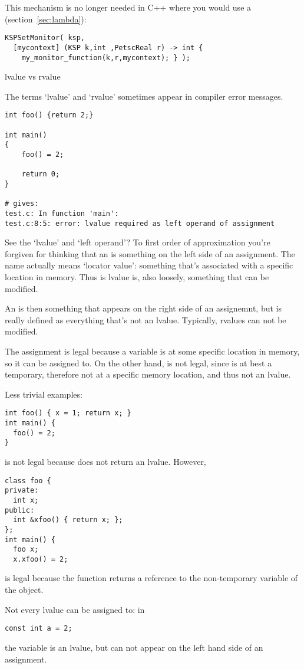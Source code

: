 This mechanism is no longer needed in C++ where you would use a
 (section~\ref{sec:lambda}):
\begin{verbatim}
KSPSetMonitor( ksp,
  [mycontext] (KSP k,int ,PetscReal r) -> int {
    my_monitor_function(k,r,mycontext); } );
\end{verbatim}


 {lvalue vs rvalue}
\label{sec:lrvalue}

The terms `lvalue' and `rvalue' sometimes appear in compiler error
messages.
\begin{verbatim}
int foo() {return 2;}

int main()
{
    foo() = 2;

    return 0;
}

# gives:
test.c: In function 'main':
test.c:8:5: error: lvalue required as left operand of assignment
\end{verbatim}

See the `lvalue' and `left operand'? To first order of approximation
you're forgiven for thinking that an  is something
on the left side of an assignment. The name actually means `locator
value': something that's associated with a specific location in
memory. Thus is lvalue is, also loosely, something that can be modified.

An  is then something that appears on the right
side of an assignemnt, but is really defined as everything that's not
an lvalue. Typically, rvalues can not be modified.

The assignment  is legal because a variable  is at some specific
location in memory, so it can be assigned to. On the other hand,
 is not legal, since  is at best a temporary,
therefore not at a specific memory location, and thus not an lvalue.

Less trivial examples:
\begin{verbatim}
int foo() { x = 1; return x; }
int main() {
  foo() = 2;
}
\end{verbatim}
is not legal because  does not return an lvalue. However,
\begin{verbatim}
class foo {
private:
  int x;
public:
  int &xfoo() { return x; };
};
int main() {
  foo x;
  x.xfoo() = 2;
\end{verbatim}
is legal because the function  returns a reference to the
non-temporary variable  of the  object.

Not every lvalue can be assigned to: in
\begin{verbatim}
const int a = 2;
\end{verbatim}
the variable  is an lvalue, but can not appear on the left hand
side of an assignment.

